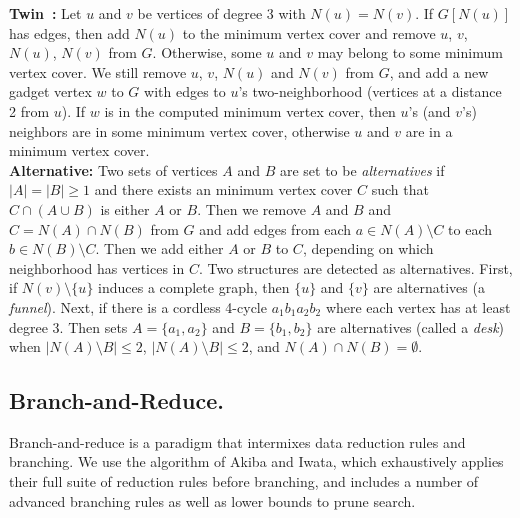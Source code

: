 \documentclass[twoside,leqno,twocolumn]{article}
\begin{document}
\noindent\textbf{Twin~\cite{Xiao201392}:} Let $u$ and $v$ be vertices of degree 3 with $N(u) = N(v)$. If $G[N(u)]$ has edges, then add $N(u)$ to the minimum vertex cover and remove $u$, $v$, $N(u)$, $N(v)$ from $G$. Otherwise, some $u$ and $v$ may belong to some minimum vertex cover. We still remove $u$, $v$, $N(u)$ and $N(v)$ from $G$, and add a new gadget vertex $w$ to $G$ with edges to $u$'s two-neighborhood (vertices at a distance 2 from $u$). If $w$ is in the computed minimum vertex cover, then $u$'s (and $v$'s) neighbors are in some minimum vertex cover, otherwise $u$ and $v$ are in a minimum vertex cover.\\

\noindent\textbf{Alternative:} Two sets of vertices $A$ and $B$ are set to be \emph{alternatives} if $|A| = |B| \geq 1$ and there exists an minimum vertex cover $C$ such that $C\cap(A\cup B)$ is either $A$ or $B$. Then we remove $A$ and $B$ and $C = N(A)\cap N(B)$ from $G$ and add edges from each $a \in N(A)\setminus C$ to each $b\in N(B)\setminus C$.
Then we add either $A$ or $B$ to $C$, depending on which neighborhood has vertices in $C$. Two structures are detected as alternatives. First, if $N(v)\setminus \{u\}$ induces a complete graph, then $\{u\}$ and $\{v\}$ are alternatives (a \emph{funnel}). Next, if there is a cordless 4-cycle $a_1b_1a_2b_2$ where each vertex has at least degree 3. Then sets $A=\{a_1, a_2\}$ and $B=\{b_1, b_2\}$ are alternatives (called a \emph{desk}) when $|N(A) \setminus B| \leq 2$, $|N(A) \setminus B| \leq 2$, and $N(A) \cap N(B) = \emptyset$. 

\subsection{Branch-and-Reduce.}
Branch-and-reduce is a paradigm that intermixes data reduction rules and branching. We use the algorithm of Akiba and Iwata, which exhaustively applies their full suite of reduction rules before branching, and includes a number of advanced branching rules as well as lower bounds to prune search. 
\end{document}
